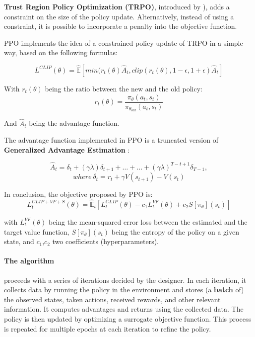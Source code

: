 \documentclass{article}
\begin{document}
\textbf{Trust Region Policy Optimization (TRPO)}, introduced by \citet{DBLP:journals/corr/SchulmanLMJA15}), adds a constraint on the size of the policy update. Alternatively, instead of using a constraint, it is possible to incorporate a penalty into the objective function.


PPO implements the idea of a constrained policy update of TRPO in a simple way, based on the following formulas:

\begin{displaymath}
L^{CLIP}(\theta) = \hat{\mathbb{E}}[min(r_t (\theta)\hat{A}_t, clip(r_t(\theta), 1-\epsilon, 1+\epsilon)\hat{A}_t]
\end{displaymath}

With \(r_t(\theta)\) being the ratio between the new and the old policy:
\begin{displaymath}
r_t(\theta) = \frac{\pi_\theta(a_t,s_t)}{\pi_{\theta_{old}}(a_t,s_t)}
\end{displaymath}

And \(\hat{A}_t\) being the advantage function.

The advantage function implemented in PPO is a truncated version of \textbf{Generalized Advantage Estimation} \citep{schulman2018highdimensional}:

\begin{displaymath}
\hat{A}_t = \delta_t + (\gamma\lambda)\delta_{t+1} + \dots + \dots + (\gamma\lambda)^{T-t+1} \delta_{T-1},
\end{displaymath}
\begin{displaymath}
{where\ }\delta_t = r_t + \gamma V(s_{t+1}) - V(s_t)
\end{displaymath}

In conclusion, the objective proposed by PPO is:
\begin{displaymath}
L_t^{CLIP+VF+S}(\theta) = \hat{\mathbb{E}}_t [L_t^{CLIP}(\theta) - c_1 L_t^{VF}(\theta) +c_2S[\pi_\theta](s_t)]
\end{displaymath}

with \(L_t^{VF}(\theta)\) being the mean-squared error loss between the estimated and the target value function, \(S[\pi_\theta](s_t)\) being the entropy of the policy on a given state, and \(c_1\),\(c_2\) two coefficients (hyperparameters).

\paragraph{The algorithm} proceeds with a series of iterations decided by the designer. In each iteration, it collects data by running the policy in the environment and stores (a \textbf{batch} of) the observed states, taken actions, received rewards, and other relevant information. It computes advantages and returns using the collected data. The policy is then updated by optimizing a surrogate objective function. This process is repeated for multiple epochs at each iteration to refine the policy.
\end{document}

